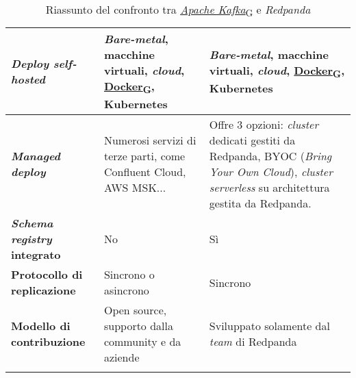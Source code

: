 \begin{longtable}{|>{\centering\arraybackslash}p{}|>{\centering\arraybackslash}p{}|>{\centering\arraybackslash}p{}|}
	\hline
	\textbf{\textit{Deploy self-hosted}}        & \textit{Bare-metal}, macchine virtuali, \textit{cloud}, \href{https://7last.github.io/docs/rtb/documentazione-interna/glossario#docker}{\href{https://7last.github.io/docs/rtb/documentazione-interna/glossario\#docker}{Docker\textsubscript{G}}}, Kubernetes & \textit{Bare-metal}, macchine virtuali, \textit{cloud}, \href{https://7last.github.io/docs/rtb/documentazione-interna/glossario#docker}{\href{https://7last.github.io/docs/rtb/documentazione-interna/glossario\#docker}{Docker\textsubscript{G}}}, Kubernetes            \\
	\hline
	\textbf{\textit{Managed deploy}}            & Numerosi servizi di terze parti, come Confluent Cloud, AWS MSK...                                                                                           & Offre 3 opzioni: \textit{cluster} dedicati gestiti da Redpanda, BYOC (\textit{Bring Your Own Cloud}), \textit{cluster serverless} su architettura gestita da Redpanda. \\
	\hline
	\textbf{\textit{Schema registry} integrato} & No                                                                                                                                                          & Sì                                                                                                                                                                     \\
	\hline
	\textbf{Protocollo di replicazione}         & Sincrono o asincrono                                                                                                                                        & Sincrono                                                                                                                                                               \\
	\hline
	\textbf{Modello di contribuzione}           & Open source, supporto dalla community e da aziende                                                                                                          & Sviluppato solamente dal \textit{team} di Redpanda                                                                                                                     \\
	\hline
	\caption{Riassunto del confronto tra \href{https://7last.github.io/docs/rtb/documentazione-interna/glossario\#apache-kafka}{\textit{Apache Kafka}\textsubscript{G}} e \textit{Redpanda}}
	\label{table:2}
\end{longtable}





















